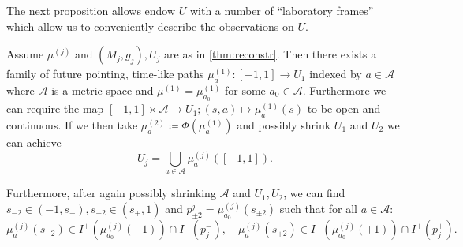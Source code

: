 The next proposition allows endow $U$ with a number of \enquote{laboratory frames} which allow us to conveniently describe the observations on $U$.
\begin{proposition}
Assume $\mu^{(j)}$ and $(M_j,g_j), U_j$ are as in \ref{thm:reconstr}. 
Then there exists a family of future pointing, time-like paths $\mu_a^{(1)}:[-1,1]\to U_1$ indexed by $a\in \mathcal{A}$ where $\mathcal{A}$ is a metric space and $\mu^{(1)}=\mu_{a_0}^{(1)}$ for some $a_0\in\mathcal{A}$. Furthermore we can require the map $[-1,1]\times\mathcal{A}\to U_1; (s,a)\mapsto \mu^{(1)}_a(s)$ to be open and continuous. If we then take $\mu^{(2)}_a\coloneqq\Phi(\mu^{(1)}_a)$ and possibly shrink $U_1$ and $U_2$ we can achieve
\begin{equation}\label{eq:frameunion}
U_j = \bigcup_{a\in \mathcal{A}}\mu^{(j)}_a([-1,1]).
\end{equation}

Furthermore, after again possibly shrinking $\mathcal{A}$ and $U_1,U_2$, we can find $s_{-2}\in (-1,s_-), s_{+2}\in (s_+,1)$ and $p^j_{\pm 2}=\mu^{(j)}_{a_0}(s_{\pm2})$ such that for all $a\in \mathcal{A}$:
\begin{equation}\label{eq:framerestriction}
    \mu^{(j)}_a(s_{-2})\in I^+(\mu^{(j)}_{a_0}(-1))\cap I^-(p^-_j), \quad
\mu^{(j)}_a(s_{+2})\in I^-(\mu^{(j)}_{a_0}(+1))\cap I^+(p^+_j).
\end{equation}
\end{proposition}
